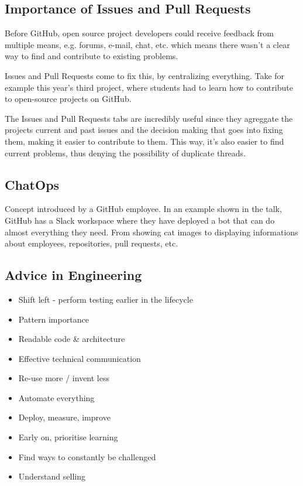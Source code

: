 \documentclass[../ESOF_notes.tex]{subfiles}
\begin{document}
 

\subsection{Importance of Issues and Pull Requests}

Before GitHub, open source project developers could receive feedback from multiple means, e.g. forums, e-mail, chat, etc. which means there wasn't a clear way to find and contribute to existing problems.

Issues and Pull Requests come to fix this, by centralizing everything. Take for example this year's third project, where students had to learn how to contribute to open-source projects on GitHub.

The Issues and Pull Requests tabs are incredibly useful since they agreggate the projects current and past issues and the decision making that goes into fixing them, making it easier to contribute to them.
This way, it's also easier to find current problems, thus denying the possibility of duplicate threads.

\subsection{ChatOps}

Concept introduced by a GitHub employee. In an example shown in the talk, GitHub has a Slack workspace where they have deployed a bot that can do almost everything they need.
From showing cat images to displaying informations about employees, repositories, pull requests, etc.

\subsection{Advice in Engineering}
\begin{itemize}
    \item Shift left - perform testing earlier in the lifecycle
    \item Pattern importance
    \item Readable code \& architecture
    \item Effective technical communication
    \item Re-use more / invent less
    \item Automate everything
    \item Deploy, measure, improve
    \item Early on, prioritise learning
    \item Find ways to constantly be challenged
    \item Understand selling
\end{itemize}
\end{document}
